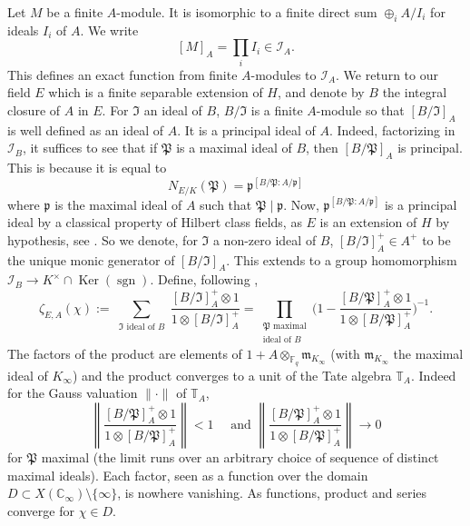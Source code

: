 \documentclass[11pt]{amsart}
\numberwithin{equation}{section}
\newcommand{\FF}{\mathbb{F}}
\newcommand{\CC}{\mathbb{C}}
\newcommand{\TT}{\mathbb{T}}
\newcommand{\sgn}{\operatorname{sgn}}
\begin{document}
Let $M$ be a finite $A$-module. It is isomorphic to a finite direct sum $\oplus_i A/I_i$ for ideals $I_i$ of $A$. We write $$[M]_A=\prod_iI_i\in\mathcal{I}_A.$$ This defines an exact function from finite $A$-modules to $\mathcal{I}_A$.
We return to our field $E$ which is a finite separable extension of $H$, and denote by $B$ the integral closure of $A$ in $E$.
For $\mathfrak{I}$ an ideal of $B$, $B/\mathfrak{I}$ is a finite $A$-module so that $[B/\mathfrak{I}]_A$ is well defined as an ideal of $A$.
It is a principal ideal of $A$. Indeed, factorizing in $\mathcal{I}_B$, it suffices to see that if $\mathfrak{P}$
is a maximal ideal of $B$, then $[B/\mathfrak{P}]_A$ is principal. This is because it is equal to $$N_{E/K}(\mathfrak{P})=\mathfrak{p}^{[B/\mathfrak{P}:A/\mathfrak{p}]}$$ where $\mathfrak{p}$ is the maximal ideal of $A$ such that $\mathfrak{P}\mid\mathfrak{p}$. Now,  
$\mathfrak{p}^{[B/\mathfrak{P}:A/\mathfrak{p}]}$ is a principal ideal 
by a classical property of Hilbert class fields, as $E$ is an extension of $H$ by hypothesis, see \cite{ANG&NGO&TAV}. So we denote,
for $\mathfrak{I}$ a non-zero ideal of $B$,
$[B/\mathfrak{I}]_A^+\in A^+$ to be the unique monic generator of $[B/\mathfrak{I}]_A$. This extends to a group homomorphism $\mathcal{I}_B\rightarrow K^\times\cap\operatorname{Ker}(\sgn)$.
Define, following \cite[\S 4.2]{ANG&NGO&TAV},
$$\zeta_{E,A}(\chi):=\sum_{\begin{smallmatrix} \mathfrak{I} \text{ ideal of } B\end{smallmatrix}}\frac{[B/\mathfrak{I}]_A^+\otimes1}{1\otimes [B/\mathfrak{I}]_A^+}=\prod_{\begin{smallmatrix} \mathfrak{P} \text{ maximal}\\\text{ideal of } B\end{smallmatrix}}\Big(1-\frac{[B/\mathfrak{P}]_A^+\otimes1}{1\otimes [B/\mathfrak{P}]_A^+}\Big)^{-1}.$$
The factors of the product are elements of $1+A\otimes_{\FF_q}\mathfrak{m}_{K_\infty}$ 
(with $\mathfrak{m}_{K_\infty}$ the maximal ideal of $K_\infty$) and the product converges to a unit of the Tate algebra $\TT_A$. Indeed for the Gauss valuation $\|\cdot\|$ of $\TT_A$,
$$\left\|\frac{[B/\mathfrak{P}]_A^+\otimes1}{1\otimes [B/\mathfrak{P}]_A^+}\right\|<1\quad \text{ and }
\left\|\frac{[B/\mathfrak{P}]_A^+\otimes1}{1\otimes [B/\mathfrak{P}]_A^+}\right\|\rightarrow0$$ for 
$\mathfrak{P}$ maximal (the limit runs over an arbitrary choice of sequence of distinct maximal ideals). Each factor, seen as a function over the domain $D\subset X(\CC_\infty)\setminus\{\infty\}$, is nowhere vanishing.
As functions, product and series 
converge for $\chi\in D$. 
\end{document}
